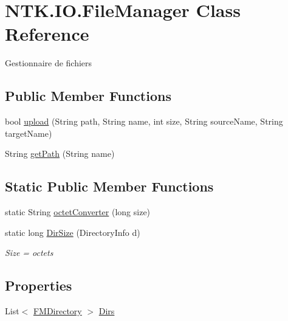 \hypertarget{class_n_t_k_1_1_i_o_1_1_file_manager}{}\section{N\+T\+K.\+I\+O.\+File\+Manager Class Reference}
\label{class_n_t_k_1_1_i_o_1_1_file_manager}


Gestionnaire de fichiers  


\subsection*{Public Member Functions}
\begin{DoxyCompactItemize}
\item 
bool \mbox{\hyperlink{class_n_t_k_1_1_i_o_1_1_file_manager_a95add86067921b318f9c5c9704ee32d2}{upload}} (String path, String name, int size, String source\+Name, String target\+Name)
\item 
String \mbox{\hyperlink{class_n_t_k_1_1_i_o_1_1_file_manager_a23c36daaeefb51ca2687712850ec6123}{get\+Path}} (String name)
\end{DoxyCompactItemize}
\subsection*{Static Public Member Functions}
\begin{DoxyCompactItemize}
\item 
static String \mbox{\hyperlink{class_n_t_k_1_1_i_o_1_1_file_manager_ad899a9fcab668809680cc1c61554c79e}{octet\+Converter}} (long size)
\item 
static long \mbox{\hyperlink{class_n_t_k_1_1_i_o_1_1_file_manager_a61b2ad390ee64a0606099305bd308b10}{Dir\+Size}} (Directory\+Info d)
\begin{DoxyCompactList}\small\item\em Size = octets \end{DoxyCompactList}\end{DoxyCompactItemize}
\subsection*{Properties}
\begin{DoxyCompactItemize}
\item 
List$<$ \mbox{\hyperlink{class_n_t_k_1_1_i_o_1_1_f_m_directory}{F\+M\+Directory}} $>$ \mbox{\hyperlink{class_n_t_k_1_1_i_o_1_1_file_manager_af2b20a2813e0a4829298c8ec66b2e4b2}{Dirs}}
\end{DoxyCompactItemize}


